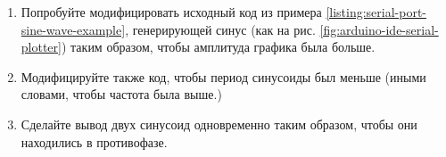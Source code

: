 \documentclass[../sparc.tex]{subfiles}
\begin{document}
\begin{enumerate}
\item Попробуйте модифицировать исходный код из примера
  \ref{listing:serial-port-sine-wave-example}, генерирующей синус (как на
  рис. \ref{fig:arduino-ide-serial-plotter}) таким образом, чтобы амплитуда
  графика была больше.
\item Модифицируйте также код, чтобы период синусоиды был меньше (иными словами,
  чтобы частота была выше.)
\item Сделайте вывод двух синусоид одновременно таким образом, чтобы они
  находились в противофазе.
\end{enumerate}
\end{document}
